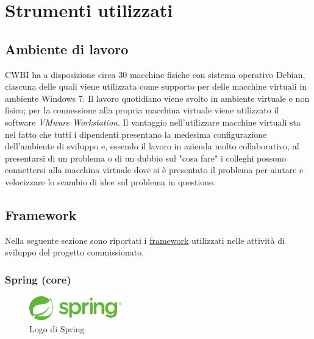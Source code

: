 \chapter{Strumenti utilizzati}
\label{cap:strumenti-utilizzati}


\setlength{\parskip}{3ex}

\section{Ambiente di lavoro}
CWBI ha a disposizione circa 30 macchine fisiche con sistema operativo Debian, ciascuna delle quali viene utilizzata come supporto per delle macchine virtuali in ambiente Windows 7. Il lavoro quotidiano viene svolto in ambiente virtuale e non fisico; per la connessione alla propria macchina virtuale viene utilizzato il software \textit{VMware Workstation}. Il vantaggio nell'utilizzare macchine virtuali sta nel fatto che tutti i dipendenti presentano la medesima configurazione dell'ambiente di sviluppo e, essendo il lavoro in azienda molto collaborativo, al presentarsi di un problema o di un dubbio sul "cosa fare" i colleghi possono connettersi alla macchina virtuale dove si è presentato il problema per aiutare e velocizzare lo scambio di idee sul problema in questione.

\pagebreak

\section{Framework}
Nella seguente sezione sono riportati i {\hyperref[para:framework-definition]{framework}}\glsfirstoccur \; utilizzati nelle attività di sviluppo del progetto commissionato. 

\subsection{Spring (core)}

\begin{figure}[!h]
	\centering
	\includegraphics[width=4cm]{../images/Spring-logo.png}
	\caption{Logo di Spring}
	\label{fig:spring}
\end{figure}

